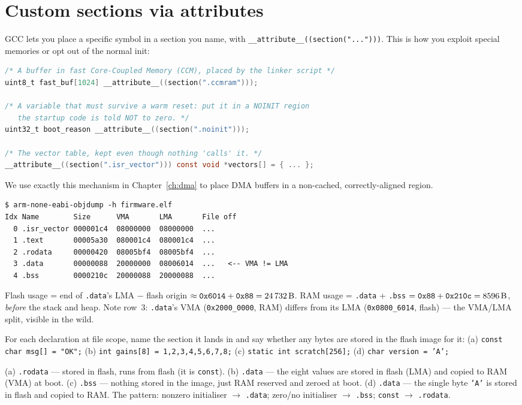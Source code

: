 \documentclass[11pt,a4paper,oneside]{book}
\newcommand{\code}[1]{\texttt{#1}}
\begin{document}
\section{Custom sections via attributes}
GCC lets you place a specific symbol in a section you name, with
\code{\_\_attribute\_\_(\allowbreak(section("...")))}. This is how you exploit special
memories or opt out of the normal init:
\begin{lstlisting}[language=C]
/* A buffer in fast Core-Coupled Memory (CCM), placed by the linker script */
uint8_t fast_buf[1024] __attribute__((section(".ccmram")));

/* A variable that must survive a warm reset: put it in a NOINIT region
   the startup code is told NOT to zero. */
uint32_t boot_reason __attribute__((section(".noinit")));

/* The vector table, kept even though nothing 'calls' it. */
__attribute__((section(".isr_vector"))) const void *vectors[] = { ... };
\end{lstlisting}
We use exactly this mechanism in Chapter~\ref{ch:dma} to place DMA buffers in a
non-cached, correctly-aligned region.

\begin{wexample}[Reading section sizes from \code{objdump}]
\begin{lstlisting}[style=shell]
$ arm-none-eabi-objdump -h firmware.elf
Idx Name        Size      VMA       LMA       File off
  0 .isr_vector 000001c4  08000000  08000000  ...
  1 .text       00005a30  080001c4  080001c4  ...
  2 .rodata     00000420  08005bf4  08005bf4  ...
  3 .data       00000088  20000000  08006014  ...   <-- VMA != LMA
  4 .bss        0000210c  20000088  20000088  ...
\end{lstlisting}
Flash usage = end of \code{.data}'s LMA $-$ flash origin
$\approx \texttt{0x6014}+\texttt{0x88} = \qty{24732}{\byte}$. RAM usage =
\code{.data} + \code{.bss} $= \texttt{0x88}+\texttt{0x210c} =
\qty{8596}{\byte}$, \emph{before} the stack and heap. Note row~3: \code{.data}'s
VMA (\code{0x2000\_0000}, RAM) differs from its LMA (\code{0x0800\_6014},
flash) --- the VMA/LMA split, visible in the wild.
\end{wexample}

\begin{exercise}
For each declaration at file scope, name the section it lands in and say whether
any bytes are stored in the flash image for it:
(a) \code{const char msg[] = "OK";}
(b) \code{int gains[8] = {1,2,3,4,5,6,7,8};}
(c) \code{static int scratch[256];}
(d) \code{char version = 'A';}
\end{exercise}
\begin{solution}
(a) \code{.rodata} --- stored in flash, runs from flash (it is \code{const}).
(b) \code{.data} --- the eight values are stored in flash (LMA) and copied to
RAM (VMA) at boot. (c) \code{.bss} --- nothing stored in the image, just RAM
reserved and zeroed at boot. (d) \code{.data} --- the single byte \code{'A'} is
stored in flash and copied to RAM. The pattern: nonzero initialiser $\to$
\code{.data}; zero/no initialiser $\to$ \code{.bss}; \code{const} $\to$
\code{.rodata}.
\end{solution}
\end{document}
